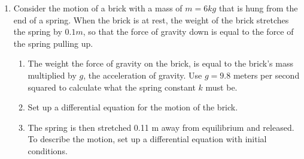 \begin{problem}
\begin{enumerate}
    \item Consider the motion of a brick with a mass of $m=6kg$ that is hung from the end of
        a spring.  When the brick is at rest, the weight of the brick stretches the spring
        by $0.1 m$, so that the force of gravity down is equal to the force of the spring
        pulling up. 
        \begin{enumerate}
            \item The weight the force of gravity on the brick, is equal to the brick's
                mass multiplied by $g$, the acceleration of gravity. Use $g = 9.8$ meters
                per second squared to calculate what the spring constant $k$ must be. 
                \\
            \item Set up a differential equation for the motion of the brick.
                \\
            \item The spring is then stretched 0.11 m away from equilibrium and released.
                To describe the motion, set up a differential equation with initial
                conditions. 
                \\
        \end{enumerate}

\end{enumerate}
\end{problem}


